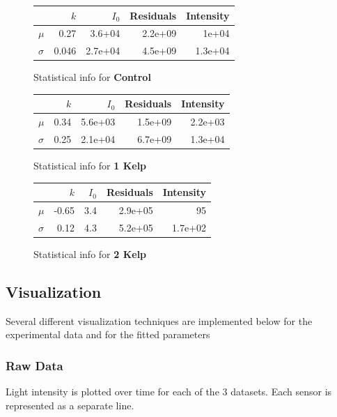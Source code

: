 \documentclass{article}
\begin{document}
\begin{figure}[H]
	\centering
	\begin{tabular}{lrrrr}
		\toprule
		&  $k$ & $I_0$ & Residuals & Intensity\\
		\midrule
		$\mu$ & 0.27 & 3.6+04 & 2.2e+09 & 1e+04 \\
		$\sigma$ & 0.046 & 2.7e+04 & 4.5e+09 & 1.3e+04 \\
	\end{tabular}
	\caption{Statistical info for \textbf{Control}}
	\label{stats_control}
\end{figure}

\begin{figure}[H]
	\centering
	\begin{tabular}{lrrrr}
		\toprule
		&  $k$ & $I_0$ & Residuals & Intensity\\
		\midrule
		$\mu$ & 0.34 & 5.6e+03 & 1.5e+09 & 2.2e+03 \\
		$\sigma$ & 0.25 & 2.1e+04 & 6.7e+09 & 1.3e+04 \\
	\end{tabular}
	\caption{Statistical info for \textbf{1 Kelp}}
	\label{stats_1_kelp}
\end{figure}

\begin{figure}[H]
	\centering
	\begin{tabular}{lrrrr}
		\toprule
		&  $k$ & $I_0$ & Residuals & Intensity\\
		\midrule
		$\mu$ & -0.65 & 3.4 & 2.9e+05 & 95 \\
		$\sigma$ & 0.12 & 4.3 & 5.2e+05 & 1.7e+02 \\
	\end{tabular}
	\caption{Statistical info for \textbf{2 Kelp}}
	\label{stats_2_kelp}
\end{figure}
	
\pagebreak
\subsection{Visualization}
Several different visualization techniques are implemented below for the experimental data and for the fitted parameters

\subsubsection{Raw Data}

Light intensity is plotted over time for each of the 3 datasets. Each sensor is represented as a separate line.
\end{document}
